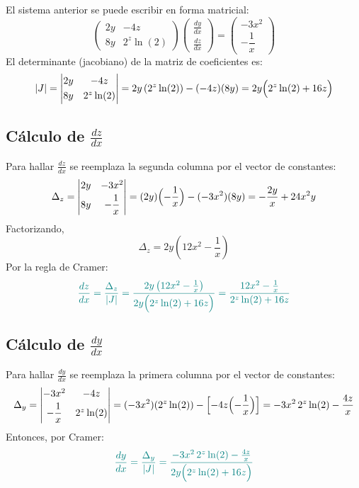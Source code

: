 \documentclass{article}
\begin{document}
El sistema anterior se puede escribir en forma matricial:
\[
\begin{pmatrix}
2y & -4z \\[1mm]
8y & 2^z\ln(2)
\end{pmatrix}
\begin{pmatrix}
\displaystyle \frac{dy}{dx} \\[1mm]
\displaystyle \frac{dz}{dx}
\end{pmatrix}
=
\begin{pmatrix}
-3x^2 \\[1mm]
-\dfrac{1}{x}
\end{pmatrix}
\]
El determinante (jacobiano) de la matriz de coeficientes es:
\[
|J|= 
\begin{vmatrix}
2y & -4z \\[1mm]
8y & 2^z\ln(2)
\end{vmatrix}
= 2y\,(2^z\ln(2)) - (-4z)(8y) = 2y\Bigl(2^z\ln(2)+16z\Bigr)
\]

\subsection*{Cálculo de \(\displaystyle \frac{dz}{dx}\)}
Para hallar \(\frac{dz}{dx}\) se reemplaza la segunda columna por el vector de constantes:
\[
\Delta_{z} =
\begin{vmatrix}
2y & -3x^2 \\[1mm]
8y & -\dfrac{1}{x}
\end{vmatrix}
= (2y)\Bigl(-\frac{1}{x}\Bigr)-(-3x^2)(8y)= -\frac{2y}{x}+24x^2y
\]
Factorizando,
\[
\Delta_{z} = 2y\left(12x^2-\frac{1}{x}\right)
\]
Por la regla de Cramer:
\[
\color{teal}
\frac{dz}{dx} = \frac{\Delta_{z}}{|J|} = \frac{2y\left(12x^2-\frac{1}{x}\right)}{2y\Bigl(2^z\ln(2)+16z\Bigr)} = \frac{12x^2-\frac{1}{x}}{2^z\ln(2)+16z}
\]

\subsection*{Cálculo de \(\displaystyle \frac{dy}{dx}\)}
Para hallar \(\frac{dy}{dx}\) se reemplaza la primera columna por el vector de constantes:
\[
\Delta_{y} =
\begin{vmatrix}
-3x^2 & -4z \\[1mm]
-\dfrac{1}{x} & 2^z\ln(2)
\end{vmatrix}
= (-3x^2)(2^z\ln(2))- \Bigl[-4z\Bigl(-\frac{1}{x}\Bigr)\Bigr]
= -3x^2\,2^z\ln(2)-\frac{4z}{x}
\]
Entonces, por Cramer:
\[
\color{teal}
\frac{dy}{dx} = \frac{\Delta_{y}}{|J|} = \frac{-3x^2\,2^z\ln(2)-\frac{4z}{x}}{2y\Bigl(2^z\ln(2)+16z\Bigr)}
\]
\newpage
\end{document}
